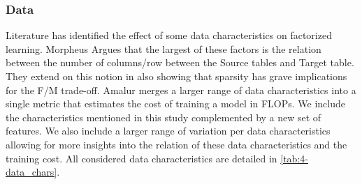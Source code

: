 \subsubsection{Data}
Literature has identified the effect of some data characteristics on factorized learning. Morpheus \cite{morpheus} Argues that the largest of these factors is the relation between the number of columns/row between the Source tables and Target table. They extend on this notion in \cite{MorpheusFIEnablingOptimizingNonlinear2019} also showing that sparsity has grave implications for the F/M trade-off. Amalur \cite{amalur} merges a larger range of data characteristics into a single metric that estimates the cost of training a model in FLOPs. We include the characteristics mentioned in this study complemented by a new set of features. We also include a larger range of variation per data characteristics allowing for more insights into the relation of these data characteristics and the training cost. All considered data characteristics are detailed in \autoref{tab:4-data_chars}.

